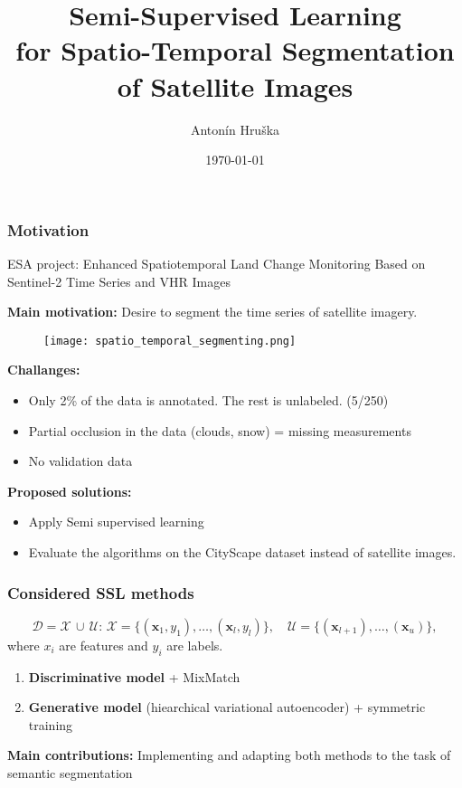 \documentclass[aspectratio=169,11pt]{beamer}
\title{Semi-Supervised Learning \\for Spatio-Temporal Segmentation of Satellite Images}
\author{Antonín Hruška}
\date{\today}
\begin{document}
\maketitle

\begin{frame}
    \frametitle{Motivation}
    ESA project: Enhanced Spatiotemporal Land Change Monitoring Based on Sentinel-2 Time Series and VHR Images

    \textbf{Main motivation:}  Desire to segment the time series of satellite imagery.
    \begin{figure}[b]
        \centering
        \texttt{[image: spatio\_temporal\_segmenting.png]}
    \end{figure}  
    
    {\footnotesize\textbf{Challanges:}    
    \begin{itemize}
            \item Only 2\% of the data is annotated. The rest is unlabeled. (5/250) 
            \item Partial occlusion in the data (clouds, snow) = missing measurements 
            \item No validation data 
    \end{itemize}
    \textbf{Proposed solutions:}
    \begin{itemize}
        \item Apply Semi supervised learning 
        \item Evaluate the algorithms on the CityScape dataset instead of satellite images. 
    \end{itemize}}
\end{frame}

\begin{frame}
    \frametitle{Considered SSL methods}
    $$
    \mathcal{D} = \mathcal{X}\,\cup\,\mathcal{U}:\, \mathcal{X} = \{(\mathbf{x}_1,y_1),\dots, (\mathbf{x}_l,y_l)\},\quad \mathcal{U} = \{(\mathbf{x}_{l+1}),\dots,(\mathbf{x}_{u})\},
    $$
    where $x_i$ are features and $y_i$ are labels. 
    \begin{enumerate}
        \item \textbf{Discriminative model} + MixMatch 
        \item \textbf{Generative model} (hiearchical variational autoencoder) + symmetric training
    \end{enumerate}
    
    \textbf{Main contributions:} Implementing and adapting both methods to the task of semantic segmentation 
\end{frame}
\end{document}
